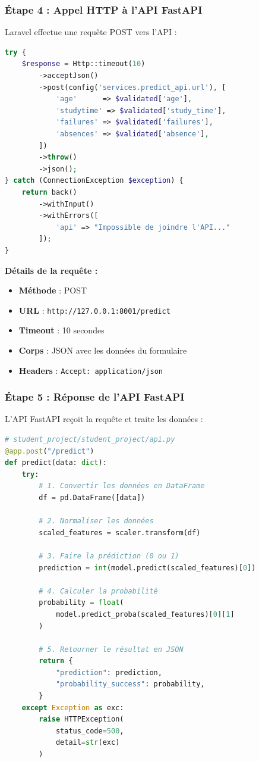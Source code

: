 \documentclass[12pt,a4paper]{article}
\begin{document}
\subsubsection{Étape 4 : Appel HTTP à l'API FastAPI}

Laravel effectue une requête POST vers l'API :

\begin{lstlisting}[language=php]
try {
    $response = Http::timeout(10)
        ->acceptJson()
        ->post(config('services.predict_api.url'), [
            'age'      => $validated['age'],
            'studytime' => $validated['study_time'],
            'failures' => $validated['failures'],
            'absences' => $validated['absence'],
        ])
        ->throw()
        ->json();
} catch (ConnectionException $exception) {
    return back()
        ->withInput()
        ->withErrors([
            'api' => "Impossible de joindre l'API..."
        ]);
}
\end{lstlisting}

\textbf{Détails de la requête :}
\begin{itemize}
    \item \textbf{Méthode} : POST
    \item \textbf{URL} : \texttt{http://127.0.0.1:8001/predict}
    \item \textbf{Timeout} : 10 secondes
    \item \textbf{Corps} : JSON avec les données du formulaire
    \item \textbf{Headers} : \texttt{Accept: application/json}
\end{itemize}

\subsubsection{Étape 5 : Réponse de l'API FastAPI}

L'API FastAPI reçoit la requête et traite les données :

\begin{lstlisting}[language=python]
# student_project/student_project/api.py
@app.post("/predict")
def predict(data: dict):
    try:
        # 1. Convertir les données en DataFrame
        df = pd.DataFrame([data])
        
        # 2. Normaliser les données
        scaled_features = scaler.transform(df)
        
        # 3. Faire la prédiction (0 ou 1)
        prediction = int(model.predict(scaled_features)[0])
        
        # 4. Calculer la probabilité
        probability = float(
            model.predict_proba(scaled_features)[0][1]
        )
        
        # 5. Retourner le résultat en JSON
        return {
            "prediction": prediction,
            "probability_success": probability,
        }
    except Exception as exc:
        raise HTTPException(
            status_code=500, 
            detail=str(exc)
        )
\end{lstlisting}
\end{document}
